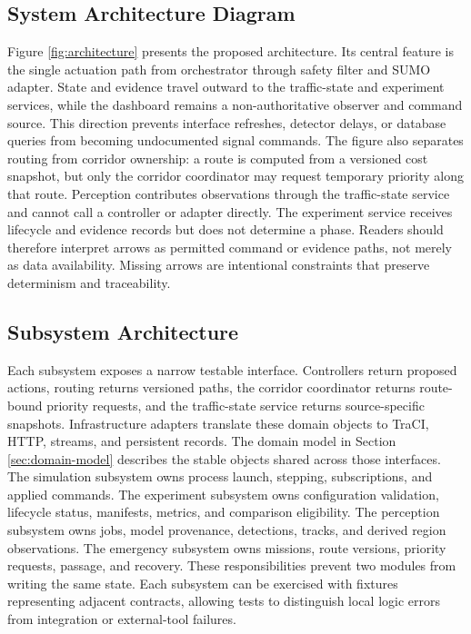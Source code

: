 \subsection{System Architecture Diagram}

Figure \ref{fig:architecture} presents the proposed architecture. Its central feature is the single actuation path from orchestrator through safety filter and SUMO adapter. State and evidence travel outward to the traffic-state and experiment services, while the dashboard remains a non-authoritative observer and command source. This direction prevents interface refreshes, detector delays, or database queries from becoming undocumented signal commands. The figure also separates routing from corridor ownership: a route is computed from a versioned cost snapshot, but only the corridor coordinator may request temporary priority along that route. Perception contributes observations through the traffic-state service and cannot call a controller or adapter directly. The experiment service receives lifecycle and evidence records but does not determine a phase. Readers should therefore interpret arrows as permitted command or evidence paths, not merely as data availability. Missing arrows are intentional constraints that preserve determinism and traceability.

\subsection{Subsystem Architecture}

Each subsystem exposes a narrow testable interface. Controllers return proposed actions, routing returns versioned paths, the corridor coordinator returns route-bound priority requests, and the traffic-state service returns source-specific snapshots. Infrastructure adapters translate these domain objects to TraCI, HTTP, streams, and persistent records. The domain model in Section \ref{sec:domain-model} describes the stable objects shared across those interfaces. The simulation subsystem owns process launch, stepping, subscriptions, and applied commands. The experiment subsystem owns configuration validation, lifecycle status, manifests, metrics, and comparison eligibility. The perception subsystem owns jobs, model provenance, detections, tracks, and derived region observations. The emergency subsystem owns missions, route versions, priority requests, passage, and recovery. These responsibilities prevent two modules from writing the same state. Each subsystem can be exercised with fixtures representing adjacent contracts, allowing tests to distinguish local logic errors from integration or external-tool failures.

